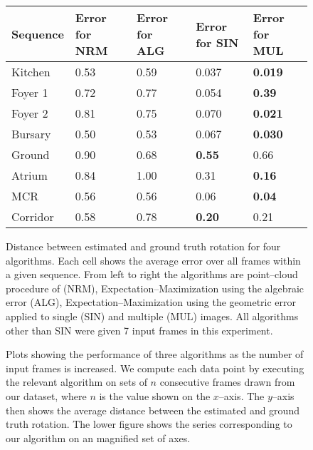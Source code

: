 \begin{figure}[tb]
  \centering
  \begin{tabular}{@{}p{2cm}p{3cm}p{3cm}p{3cm}p{3cm}@{}}
    \toprule
    Sequence & Error for NRM & Error for ALG & Error for SIN & Error
    for MUL \\
    \midrule
    Kitchen  & 0.53   & 0.59   & 0.037  & \textbf{0.019} \\
    Foyer 1   & 0.72   & 0.77   & 0.054  & \textbf{0.39} \\
    Foyer 2  & 0.81   & 0.75   & 0.070  & \textbf{0.021} \\
    Bursary  & 0.50   & 0.53   & 0.067  & \textbf{0.030} \\
    Ground   & 0.90   & 0.68   & \textbf{0.55}   & 0.66 \\
    Atrium   & 0.84   & 1.00   & 0.31  & \textbf{0.16} \\
    MCR      & 0.56   & 0.56   & 0.06  & \textbf{0.04} \\
    Corridor & 0.58   & 0.78   & \textbf{0.20}  & 0.21 \\
    \bottomrule
  \end{tabular}
  \vspace{0.2cm}
  \caption{Distance between estimated and ground truth rotation for
    four algorithms. Each cell shows the average error over all frames
    within a given sequence. From left to right the algorithms are
    point--cloud procedure of \cite{Furukawa09} (NRM),
    Expectation--Maximization using the algebraic error (ALG),
    Expectation--Maximization using the geometric error applied to
    single (SIN) and multiple (MUL) images. All algorithms other than
    SIN were given 7 input frames in this experiment.}
  \label{fig:performance}
\end{figure}

\begin{figure}[tb]
  \centering
  \newline
  \caption{Plots showing the performance of three algorithms as the
    number of input frames is increased. We compute each data point by
    executing the relevant algorithm on sets of $n$ consecutive frames
    drawn from our dataset, where $n$ is the value shown on the
    $x$--axis. The $y$--axis then shows the average distance between
    the estimated and ground truth rotation. The lower figure shows
    the series corresponding to our algorithm on an magnified set of
    axes.}
  \label{fig:error-vs-nframes}
\end{figure}


